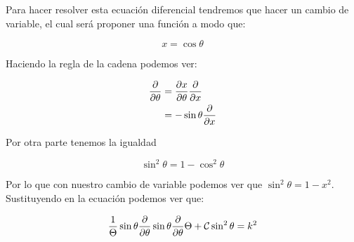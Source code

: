 \documentclass[11pt]{report}
\theoremstyle{plain}
\theoremstyle{definition}
\begin{document}
Para hacer resolver esta ecuación diferencial tendremos que hacer un cambio de variable, el cual será proponer una función a modo que:

\begin{equation*}
	x=\cos\theta
\end{equation*}

Haciendo la regla de la cadena podemos ver:

\begin{align*}
	\pdv{\theta} &= \pdv{x}{\theta}\pdv{x}\\
	&=-\sin\theta \pdv{x}
\end{align*}

Por otra parte tenemos la igualdad

\begin{equation*}
	\sin^2\theta = 1-\cos^2\theta
\end{equation*}

Por lo que con nuestro cambio de variable podemos ver que $\sin^2\theta = 1-x^2$. Sustituyendo en la ecuación podemos ver que:

\begin{equation*}

	\frac{1}{\Theta}\sin\theta\pdv{\theta}\sin\theta	\pdv{\theta}\Theta+\mathcal{C}\sin^2\theta = k^2
\end{equation*}
\end{document}
